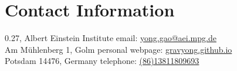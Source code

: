 \section{\sc Contact Information}
0.27, Albert Einstein Institute      \hfill email: \href{mailto:gaoyong.physics@pku.edu.cn}{yong.gao@aei.mpg.de}\\
Am Mühlenberg 1, Golm \hfill personal webpage: \href{https://gravyong.github.io/}{gravyong.github.io}\\
Potsdam 14476, Germany                                \hfill telephone: \href{tel:8613811809693}{(86)13811809693}


